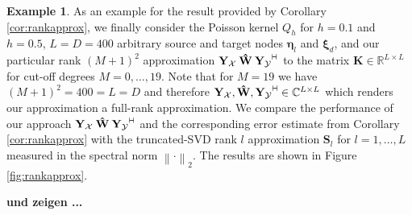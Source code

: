 \documentclass[11pt,a4paper,twoside,bibtotoc]{scrartcl}
\theoremstyle{plain}
\theoremstyle{definition}
\newtheorem{example}[theorem]{Example}
\theoremstyle{remark}
\newcommand{\R}{\ensuremath{\mathbb{R}}}
\newcommand{\C}{\ensuremath{\mathbb{C}}}
\newcommand{\adj}{{\vdash \hspace*{-1.72mm} \dashv}}
\numberwithin{equation}{section}
\numberwithin{table}{section}
\numberwithin{figure}{section}
\begin{document}
\begin{example}
As an example for the result provided by Corollary \ref{cor:rankapprox}, we 
finally consider the Poisson kernel $Q_{h}$ for 
$h = 0.1$ and $h=0.5$, $L=D=400$ arbitrary source and target nodes $\mathbf{\eta}_{l}$ and $\mathbf{\xi}_{d}$,
and our particular rank $(M+1)^2$ approximation 
$\mathbf{Y_{\mathcal{X}}} \: \mathbf{\hat W} \: \mathbf{Y_{\mathcal{Y}}}^{\adj}$ to the matrix $\mathbf{K} \in \R^{L \times L}$ 
for cut-off degrees $M=0,\ldots,19$. Note that for $M=19$ we 
have $(M+1)^2 = 400 = L = D$ and therefore $\mathbf{Y_{\mathcal{X}}}, \mathbf{\hat W}, 
\mathbf{Y_{\mathcal{Y}}}^{\adj} \in \C^{L \times L}$ which renders our approximation a full-rank 
approximation. We compare the performance of our approach $\mathbf{Y_{\mathcal{X}}} \: \mathbf{\hat W} \: 
\mathbf{Y_{\mathcal{Y}}}^{\adj}$ and the corresponding error estimate from Corollary \ref{cor:rankapprox}
with the truncated-SVD rank $l$ approximation $\mathbf{S}_{l}$ for $l = 1,\ldots,L$
measured in the spectral norm $\left\|\cdot\right\|_{2}$. The results are shown in Figure \ref{fig:rankapprox}. 

{\bf und zeigen ...}
 
\end{example}
\end{document}
